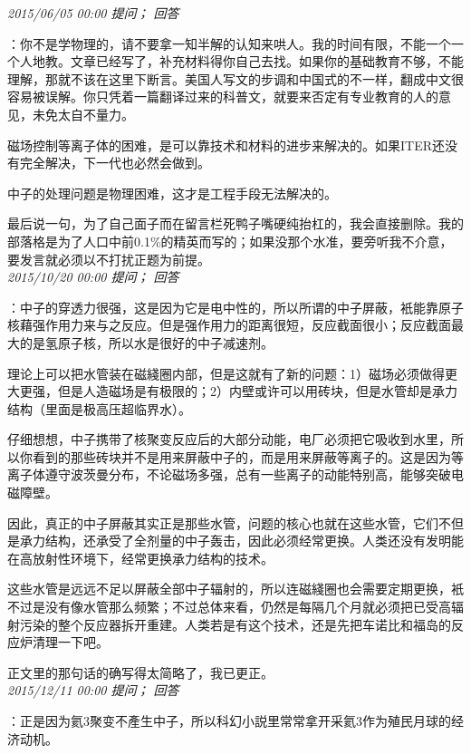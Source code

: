 \documentclass[twocolumn]{ctexart}
\begin{document}
\textit{\hfill\noindent\small 2015/06/05 00:00 提问； 回答}

：你不是学物理的，请不要拿一知半解的认知来哄人。我的时间有限，不能一个一个人地教。文章已经写了，补充材料得你自己去找。如果你的基础教育不够，不能理解，那就不该在这里下断言。美国人写文的步调和中国式的不一样，翻成中文很容易被误解。你只凭着一篇翻译过来的科普文，就要来否定有专业教育的人的意见，未免太自不量力。

磁场控制等离子体的困难，是可以靠技术和材料的进步来解决的。如果ITER还没有完全解决，下一代也必然会做到。

中子的处理问题是物理困难，这才是工程手段无法解决的。

最后说一句，为了自己面子而在留言栏死鸭子嘴硬纯抬杠的，我会直接删除。我的部落格是为了人口中前0.1\%的精英而写的；如果没那个水准，要旁听我不介意，要发言就必须以不打扰正题为前提。\\

\textit{\hfill\noindent\small 2015/10/20 00:00 提问； 回答}

：中子的穿透力很强，这是因为它是电中性的，所以所谓的中子屏蔽，衹能靠原子核藉强作用力来与之反应。但是强作用力的距离很短，反应截面很小；反应截面最大的是氢原子核，所以水是很好的中子减速剂。

理论上可以把水管装在磁綫圈内部，但是这就有了新的问题：1）磁场必须做得更大更强，但是人造磁场是有极限的；2）内壁或许可以用砖块，但是水管却是承力结构（里面是极高压超临界水）。

仔细想想，中子携带了核聚变反应后的大部分动能，电厂必须把它吸收到水里，所以你看到的那些砖块并不是用来屏蔽中子的，而是用来屏蔽等离子的。这是因为等离子体遵守波茨曼分布，不论磁场多强，总有一些离子的动能特别高，能够突破电磁障壁。

因此，真正的中子屏蔽其实正是那些水管，问题的核心也就在这些水管，它们不但是承力结构，还承受了全剂量的中子轰击，因此必须经常更换。人类还没有发明能在高放射性环境下，经常更换承力结构的技术。

这些水管是远远不足以屏蔽全部中子辐射的，所以连磁綫圈也会需要定期更换，衹不过是没有像水管那么频繁；不过总体来看，仍然是每隔几个月就必须把已受高辐射污染的整个反应器拆开重建。人类若是有这个技术，还是先把车诺比和福岛的反应炉清理一下吧。

正文里的那句话的确写得太简略了，我已更正。\\

\textit{\hfill\noindent\small 2015/12/11 00:00 提问； 回答}

：正是因为氦3聚变不產生中子，所以科幻小説里常常拿开采氦3作为殖民月球的经济动机。
\end{document}
